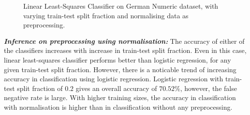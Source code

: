 \documentclass[12pt, a4 paper]{article}
\begin{document}
\begin{figure}

\caption{Linear Least-Squares Classifier on German Numeric dataset, with varying train-test split fraction and normalising data as preprocessing.}
\label{fig:german_normalise}
\end{figure}

{\it \bfseries Inference on preprocessing using normalisation:} The accuracy of either of the classifiers increases with increase in train-test split fraction. Even in this case, linear least-squares classifier performs better than logistic regression, for any given train-test split fraction. However, there is a noticable trend of increasing accuracy in classification using logistic regression. Logistic regression with train-test split fraction of $0.2$ gives an overall accuracy of $70.52 \%$, however, the false negative rate is large. With higher training sizes, the accuracy in classification with normalisation is higher than in classification without any preprocessing. \\
\end{document}
